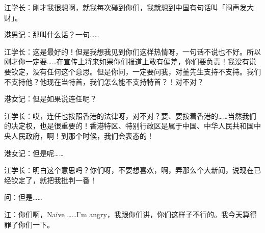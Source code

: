 江学长：刚才我很想啊，就我每次碰到你们，我就想到中国有句话叫「闷声发大财」。

港男记：那叫什么话？一句……

江学长：这是最好的！但是我想我见到你们这样热情呀，一句话不说也不好。所以刚才你一定要……在宣传上将来如果你们报道上敢有偏差，你们要负责！我没有说要钦定，没有任何这个意思。但是你问，一定要问我，对董先生支持不支持。我们不支持他？他现在当特首，我们怎么能不支持特首？！对不对？

港女记：但是如果说连任呢？

江学长：哎，连任也按照香港的法律呀，对不对？要、要按着香港的……当然我们的决定权，也是很重要的！香港特区、特别行政区是属于中国、中华人民共和国中央人民政{}府，啊！到那个时候，我们会表态的！


港女记：但是呢……

江学长：明白这个意思吗？你们呀，不要想喜欢，啊，弄那么个大新闻，说现在已经钦定了，就把我批判一番！

问：但是……

江：你们啊，Na\"ive ……I'm angry，我跟你们讲，你们这样子不行的。我今天算得罪了你们一下。
